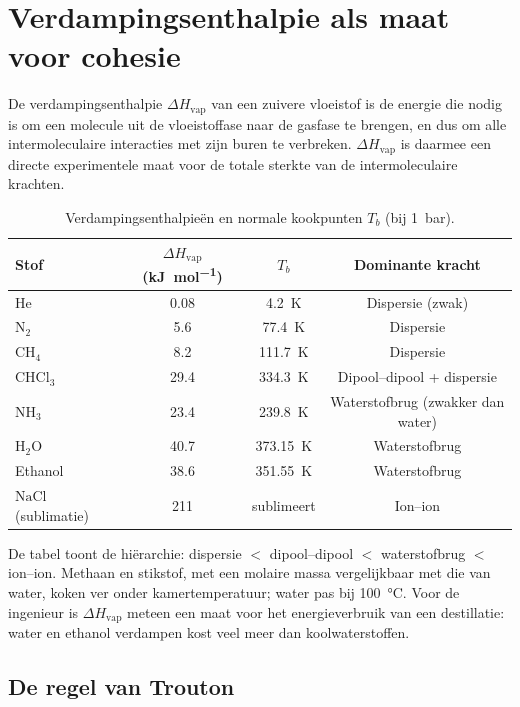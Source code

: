\section{Verdampingsenthalpie als maat voor cohesie}
\label{sec:verdampingsenthalpie}

De verdampingsenthalpie $\Delta H_{\text{vap}}$ van een zuivere vloeistof is de energie die nodig is om een molecule uit de vloeistoffase naar de gasfase te brengen, en dus om alle intermoleculaire interacties met zijn buren te verbreken. $\Delta H_{\text{vap}}$ is daarmee een directe experimentele maat voor de totale sterkte van de intermoleculaire krachten.

\begin{table}[h]
\centering
\begin{tabular}{lccc}
\toprule
Stof & $\Delta H_{\text{vap}}$ (\si{\kilo\joule\per\mole}) & $T_b$ & Dominante kracht \\
\midrule
He & 0.08 & \SI{4.2}{\kelvin} & Dispersie (zwak) \\
$\mathrm{N_2}$ & 5.6 & \SI{77.4}{\kelvin} & Dispersie \\
$\mathrm{CH_4}$ & 8.2 & \SI{111.7}{\kelvin} & Dispersie \\
$\mathrm{CHCl_3}$ & 29.4 & \SI{334.3}{\kelvin} & Dipool--dipool + dispersie \\
$\mathrm{NH_3}$ & 23.4 & \SI{239.8}{\kelvin} & Waterstofbrug (zwakker dan water) \\
$\mathrm{H_2O}$ & 40.7 & \SI{373.15}{\kelvin} & Waterstofbrug \\
Ethanol & 38.6 & \SI{351.55}{\kelvin} & Waterstofbrug \\
$\mathrm{NaCl}$ (sublimatie) & 211 & sublimeert & Ion--ion \\
\bottomrule
\end{tabular}
\caption{Verdampingsenthalpie\"en en normale kookpunten $T_b$ (bij \SI{1}{\bar}).}
\label{tab:verdampingsenthalpie}
\end{table}

De tabel toont de hi\"erarchie: dispersie $<$ dipool--dipool $<$ waterstofbrug $<$ ion--ion. Methaan en stikstof, met een molaire massa vergelijkbaar met die van water, koken ver onder kamertemperatuur; water pas bij \SI{100}{\celsius}. Voor de ingenieur is $\Delta H_\text{vap}$ meteen een maat voor het energieverbruik van een destillatie: water en ethanol verdampen kost veel meer dan koolwaterstoffen.

\subsection{De regel van Trouton}
\label{sec:trouton}

